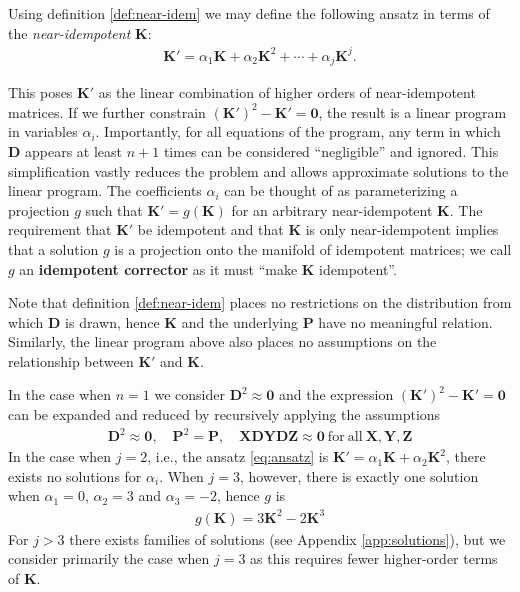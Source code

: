 \documentclass{article}
\theoremstyle{plain}
\theoremstyle{definition}
\theoremstyle{remark}
\newcommand{\vD}{\mathbf{D}}
\newcommand{\vK}{\mathbf{K}}
\newcommand{\vP}{\mathbf{P}}
\newcommand{\vX}{\mathbf{X}}
\newcommand{\vY}{\mathbf{Y}}
\newcommand{\vZ}{\mathbf{Z}}
\begin{document}
Using definition \ref{def:near-idem} we may define the following ansatz in terms of the \textit{near-idempotent} $\vK$:
%
\begin{align}
    \vK' = \alpha_1 \vK + \alpha_2 \vK^2 + \cdots + \alpha_j \vK^j.
    \label{eq:ansatz}
\end{align}

This poses $\vK'$ as the linear combination of higher orders of near-idempotent matrices. If we further constrain $(\vK')^2 - \vK' = \bm{0}$, the result is a linear program in variables $\alpha_i$. Importantly, for all equations of the program, any term in which $\vD$ appears at least $n+1$ times can be considered ``negligible'' and ignored. This simplification vastly reduces the problem and allows approximate solutions to the linear program. The coefficients $\alpha_i$ can be thought of as parameterizing a projection $g$ such that $\vK' = g(\vK)$ for an arbitrary near-idempotent $\vK$. The requirement that $\vK'$ be idempotent and that $\vK$ is only near-idempotent implies that a solution $g$ is a projection onto the manifold of idempotent matrices; we call $g$ an \textbf{idempotent corrector} as it must ``make $\vK$ idempotent''.

Note that definition \ref{def:near-idem} places no restrictions on the distribution from which $\vD$ is drawn, hence $\vK$ and the underlying $\vP$ have no meaningful relation. Similarly, the linear program above also places no assumptions on the relationship between $\vK'$ and $\vK$.

In the case when $n=1$ we consider $\vD^2 \approx \bm{0}$ and the expression $(\vK')^2 - \vK' = \bm{0}$ can be expanded and reduced by recursively applying the assumptions
%
\begin{align*}
    \vD^2 \approx \bm{0}, \quad \vP^2 = \vP, \quad \vX \vD \vY \vD \vZ \approx \bm{0} \mathrm{~for~all~} \vX,\vY,\vZ
\end{align*}
%
In the case when $j=2$, i.e., the ansatz \ref{eq:ansatz} is $\vK' = \alpha_1 \vK + \alpha_2 \vK^2$, there exists no solutions for $\alpha_i$. When $j=3$, however, there is exactly one solution when $\alpha_1 = 0$, $\alpha_2 = 3$ and $\alpha_3 = -2$, hence $g$ is
%
\begin{align}
    g(\vK) = 3\vK^2 - 2 \vK^3
    \label{eq:}
\end{align}
%
For $j>3$ there exists families of solutions (see Appendix \ref{app:solutions}), but we consider primarily the case when $j=3$ as this requires fewer higher-order terms of $\vK$.
\end{document}
